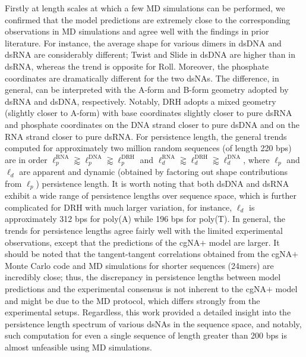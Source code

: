 Firstly at length scales at which a few MD simulations can be performed, we confirmed that the model predictions are extremely close to the corresponding observations in MD simulations and agree well with the findings in prior literature. For instance, the average shape for various dimers in dsDNA and dsRNA are considerably different; Twist and Slide in dsDNA are higher than in dsRNA, whereas the trend is opposite for Roll. 
Moreover, the phosphate coordinates are dramatically different for the two dsNAs.
The difference, in general, can be interpreted with the A-form and B-form geometry adopted by dsRNA and dsDNA, respectively.
Notably, DRH adopts a mixed geometry (slightly closer to A-form) with base coordinates slightly closer to pure dsRNA and phosphate coordinates on the DNA strand closer to pure dsDNA and on the RNA strand closer to pure dsRNA.
For persistence length, the general trends computed for approximately two million random sequences (of length 220 bps) are in order $\ell_{p}^{\text{RNA}} \gtrapprox \ell_{p}^{\text{DNA}}  \gtrapprox \ell_{p}^{\text{DRH}}$  and $\ell_{d}^{\text{RNA}} \gtrapprox \ell_{d}^{\text{DRH}} \gtrapprox \ell_{d}^{\text{DNA}}$, where $\ell_{p}$ and $\ell_{d}$ are apparent and dynamic (obtained by factoring out shape contributions from $\ell_{p}$) persistence length. 
It is worth noting that both dsDNA and dsRNA exhibit a wide range of persistence lengths over sequence space, which is further complicated for DRH with much larger variation, for instance, $\ell_{d}$ is approximately 312 bps for poly(A) while 196 bps for poly(T).
In general, the trends for persistence lengths agree fairly well with the limited experimental observations, except that the predictions of the cgNA$+$ model are larger.
It should be noted that the tangent-tangent correlations obtained from the cgNA$+$ Monte Carlo code and MD simulations for shorter sequences (24mers) are incredibly close; thus, the discrepancy in persistence lengths between model predictions and the experimental consensus is not inherent to the cgNA$+$ model and might be due to the MD protocol, which differs strongly from the experimental setups.
Regardless, this work provided a detailed insight into the persistence length spectrum of various dsNAs in the sequence space, and notably, such computation for even a single sequence of length greater than 200 bps is almost unfeasible using MD simulations.

